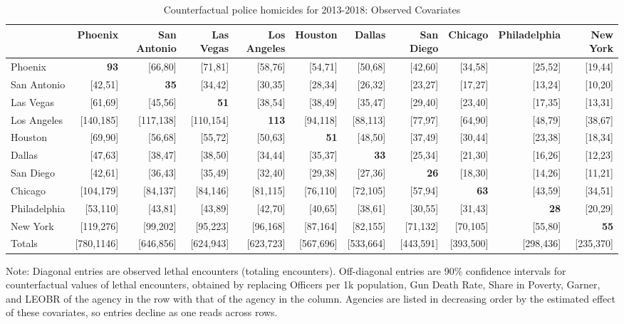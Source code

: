 \begin{table}[h!]\centering\scriptsize\tabcolsep=0.1cm\caption{Counterfactual police homicides for 2013-2018: Observed Covariates} \label{table:bootstrap_counterfactual_obs}\begin{tabular}{lrrrrrrrrrr}\hline \hline&Phoenix&San Antonio&Las Vegas&Los Angeles&Houston&Dallas&San Diego&Chicago&Philadelphia&New York\\
\hline
Phoenix&\textbf{93}&[66,80]&[71,81]&[58,76]&[54,71]&[50,68]&[42,60]&[34,58]&[25,52]&[19,44]\\
San Antonio&[42,51]&\textbf{35}&[34,42]&[30,35]&[28,34]&[26,32]&[23,27]&[17,27]&[13,24]&[10,20]\\
Las Vegas&[61,69]&[45,56]&\textbf{51}&[38,54]&[38,49]&[35,47]&[29,40]&[23,40]&[17,35]&[13,31]\\
Los Angeles&[140,185]&[117,138]&[110,154]&\textbf{113}&[94,118]&[88,113]&[77,97]&[64,90]&[48,79]&[38,67]\\
Houston&[69,90]&[56,68]&[55,72]&[50,63]&\textbf{51}&[48,50]&[37,49]&[30,44]&[23,38]&[18,34]\\
Dallas&[47,63]&[38,47]&[38,50]&[34,44]&[35,37]&\textbf{33}&[25,34]&[21,30]&[16,26]&[12,23]\\
San Diego&[42,61]&[36,43]&[35,49]&[32,40]&[29,38]&[27,36]&\textbf{26}&[18,30]&[14,26]&[11,21]\\
Chicago&[104,179]&[84,137]&[84,146]&[81,115]&[76,110]&[72,105]&[57,94]&\textbf{63}&[43,59]&[34,51]\\
Philadelphia&[53,110]&[43,81]&[43,89]&[42,70]&[40,65]&[38,61]&[30,55]&[31,43]&\textbf{28}&[20,29]\\
New York&[119,276]&[99,202]&[95,223]&[96,168]&[87,164]&[82,155]&[71,132]&[70,105]&[55,80]&\textbf{55}\\
\hline
Totals&[780,1146]&[646,856]&[624,943]&[623,723]&[567,696]&[533,664]&[443,591]&[393,500]&[298,436]&[235,370]\\
\hline 
 \end{tabular} 
 \begin{center} 
 \begin{minipage}{1.05\textwidth} %
 {\footnotesize Note: Diagonal entries are observed lethal encounters (totaling \totalincidentsten{} encounters). Off-diagonal entries are 90\% confidence intervals for counterfactual values of lethal encounters, obtained by replacing Officers per 1k population, Gun Death Rate, Share in Poverty, Garner, and LEOBR of the agency in the row with that of the agency in the column. Agencies are listed in decreasing order by the estimated effect of these covariates, so entries decline as one reads across rows.} 
 \end{minipage} 
 \end{center} 
 \end{table}